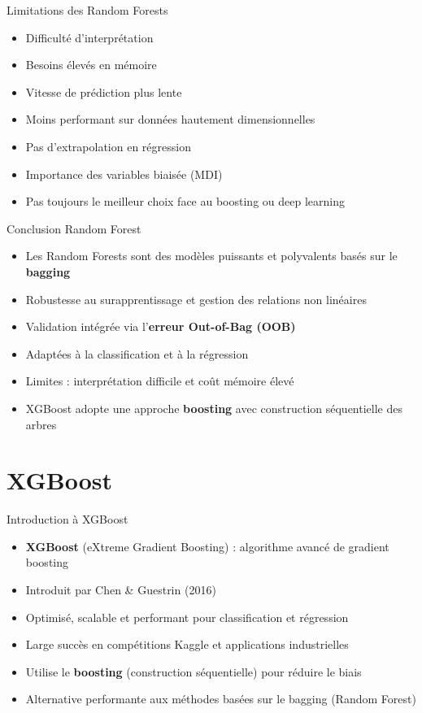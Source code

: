 \documentclass[11pt]{beamer}
\begin{document}
\begin{frame}{Limitations des Random Forests}
\begin{itemize}
    \item Difficulté d'interprétation
    \item Besoins élevés en mémoire
    \item Vitesse de prédiction plus lente
    \item Moins performant sur données hautement dimensionnelles
    \item Pas d'extrapolation en régression
    \item Importance des variables biaisée (MDI)
    \item Pas toujours le meilleur choix face au boosting ou deep learning
\end{itemize}
\end{frame}

\begin{frame}{Conclusion Random Forest}
\begin{itemize}
    \item Les Random Forests sont des modèles puissants et polyvalents basés sur le \textbf{bagging}
    \item Robustesse au surapprentissage et gestion des relations non linéaires
    \item Validation intégrée via l'\textbf{erreur Out-of-Bag (OOB)}
    \item Adaptées à la classification et à la régression
    \item Limites : interprétation difficile et coût mémoire élevé
    \item XGBoost adopte une approche \textbf{boosting} avec construction séquentielle des arbres
\end{itemize}
\end{frame}

\section{XGBoost}

\begin{frame}{Introduction à XGBoost}
\begin{itemize}
    \item \textbf{XGBoost} (eXtreme Gradient Boosting) : algorithme avancé de gradient boosting
    
    \item Introduit par Chen \& Guestrin (2016)
    
    \item Optimisé, scalable et performant pour classification et régression
    
    \item Large succès en compétitions Kaggle et applications industrielles
    \item Utilise le \textbf{boosting} (construction séquentielle) pour réduire le biais
    \item Alternative performante aux méthodes basées sur le bagging (Random Forest)
\end{itemize}
\end{frame}
\end{document}
